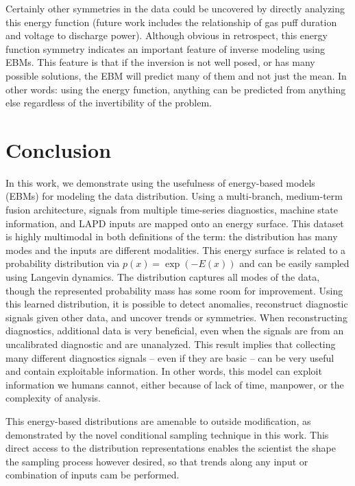 Certainly other symmetries in the data could be uncovered by directly analyzing this energy function (future work includes the relationship of gas puff duration and voltage to discharge power). Although obvious in retrospect, this energy function symmetry  indicates an important feature of inverse modeling using EBMs. This feature is that if the inversion is not well posed, or has many possible solutions, the EBM will predict many of them and not just the mean. In other words: using the energy function, anything can be predicted from anything else regardless of the invertibility of the problem.


\section{Conclusion}

In this work, we demonstrate using the usefulness of energy-based models (EBMs) for modeling the data distribution. Using a multi-branch, medium-term fusion architecture, signals from multiple time-series diagnostics, machine state information, and LAPD inputs are mapped onto an energy surface. This dataset is highly multimodal in both definitions of the term: the distribution has many modes and the inputs are different modalities. This energy surface is related to a probability distribution via $p(x) = \exp(-E(x))$ and can be easily sampled using Langevin dynamics. The distribution captures all modes of the data, though the represented probability mass has some room for improvement. Using this learned distribution, it is possible to detect anomalies, reconstruct diagnostic signals given other data, and uncover trends or symmetries. When reconstructing diagnostics, additional data is very beneficial, even when the signals are from an uncalibrated diagnostic and are unanalyzed. This result implies that collecting many different diagnostics signals -- even if they are basic -- can be very useful and contain exploitable information. In other words, this model can exploit information we humans cannot, either because of lack of time, manpower, or the complexity of analysis.

This energy-based distributions are amenable to outside modification, as demonstrated by the novel conditional sampling technique in this work. This direct access to the distribution representations enables the scientist the shape the sampling process however desired, so that trends along any input or combination of inputs cam be performed.

